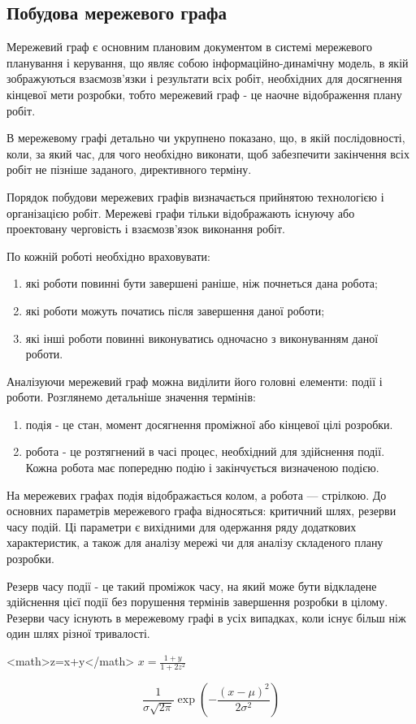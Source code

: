 \subsection{Побудова мережевого графа}
Мережевий граф є основним плановим документом в системі мережевого планування і керування, що являє собою інформаційно-динамічну модель, в якій зображуються взаємозв'язки і результати всіх робіт, необхідних для досягнення кінцевої мети розробки, тобто мережевий граф - це наочне відображення плану робіт.
\par В мережевому графі детально чи укрупнено показано, що, в якій послідовності, коли, за який час, для чого необхідно виконати, щоб забезпечити закінчення всіх робіт не пізніше заданого, директивного терміну.
\par Порядок побудови мережевих графів визначається прийнятою технологією і організацією робіт. Мережеві графи тільки відображають існуючу або проектовану черговість і взаємозв'язок виконання робіт.
\par По кожній роботі необхідно враховувати:
\begin{enumerate}
	\item які роботи повинні бути завершені раніше, ніж почнеться дана робота;
	\item які роботи можуть початись після завершення даної роботи;
	\item які інші роботи повинні виконуватись одночасно з виконуванням даної роботи.
\end{enumerate}

\par Аналізуючи мережевий граф можна виділити його головні елементи: події і роботи. Розглянемо детальніше значення термінів:
\begin{enumerate}
	\item подія - це стан, момент досягнення проміжної або кінцевої цілі розробки.
	\item робота - це розтягнений в часі процес, необхідний для здійснення події. Кожна робота має попередню подію і закінчується визначеною подією.
\end{enumerate}

\par На мережевих графах подія відображається колом, а робота --- стрілкою. До основних параметрів мережевого графа відносяться: критичний шлях, резерви часу подій. Ці параметри є вихідними для одержання ряду додаткових характеристик, а також для аналізу мережі чи для аналізу складеного плану розробки.
\par Резерв часу події - це такий проміжок часу, на який може бути відкладене здійснення цієї події без порушення термінів завершення розробки в цілому. Резерви часу існують в мережевому графі в усіх випадках, коли існує більш ніж один шлях різної тривалості.


<math>z=x+y</math>
$x=\frac{1+y}{1+2z^2}$

\begin{equation}
   \frac{1}{\sigma\sqrt{2\pi}}\exp\left(-\frac{(x-\mu)^2}{2\sigma^2}\right)
 \end{equation}